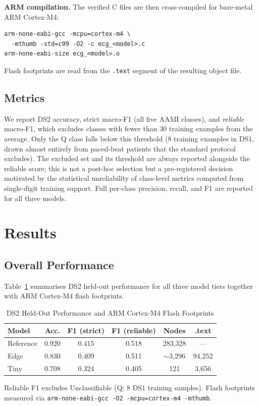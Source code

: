 \documentclass[journal,twoside]{IEEEtran}
\begin{document}
\textbf{ARM compilation.} The verified C files are then cross-compiled for
bare-metal ARM Cortex-M4:

\begin{verbatim}
arm-none-eabi-gcc -mcpu=cortex-m4 \
  -mthumb -std=c99 -O2 -c ecg_<model>.c
arm-none-eabi-size ecg_<model>.o
\end{verbatim}

\noindent Flash footprints are read from the \texttt{.text} segment of the
resulting object file.

\subsection{Metrics}

We report DS2 accuracy, strict macro-F1 (all five AAMI classes), and
\emph{reliable} macro-F1, which excludes classes with fewer than 30
training examples from the average. Only the Q class falls below this
threshold (8 training examples in DS1, drawn almost entirely from
paced-beat patients that the standard protocol excludes). The excluded set
and its threshold are always reported alongside the reliable score; this
is not a post-hoc selection but a pre-registered decision motivated by the
statistical unreliability of class-level metrics computed from
single-digit training support. Full per-class precision, recall, and F1
are reported for all three models.

\section{Results}

\subsection{Overall Performance}

Table~\ref{tab:overall} summarises DS2 held-out performance for all
three model tiers together with ARM Cortex-M4 flash footprints.

\begin{table}[htbp]
\caption{DS2 Held-Out Performance and ARM Cortex-M4 Flash Footprints}
\label{tab:overall}
\centering
\begin{tabular}{lccccc}
\toprule
Model & Acc. & F1 (strict) & F1 (reliable) & Nodes & .text \\
\midrule
Reference & 0.920 & 0.415 & 0.518 & 283{,}328 & --- \\
Edge      & 0.830 & 0.409 & 0.511 & $\sim$3{,}296 & 94{,}252 \\
Tiny      & 0.708 & 0.324 & 0.405 & 121       & 3{,}656 \\
\bottomrule
\end{tabular}
\vspace{2pt}
\small{Reliable F1 excludes Unclassifiable (Q; 8 DS1 training samples).
Flash footprints measured via \texttt{arm-none-eabi-gcc -O2 -mcpu=cortex-m4 -mthumb}.}
\end{table}
\end{document}
